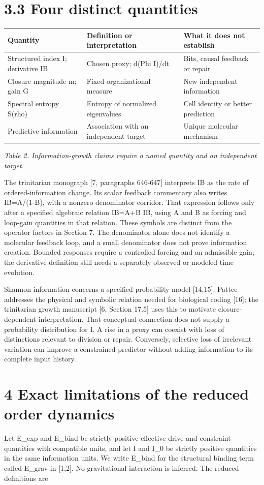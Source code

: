 \documentclass[11pt,a4paper]{article}
\begin{document}
\section*{3.3 Four distinct quantities}
\begin{longtable}{p{5.27cm}|p{5.27cm}|p{5.27cm}}
Quantity & Definition or interpretation & What it does not establish\\\hline
Structured index I; derivative IB & Chosen proxy; d(Phi I)/dt & Bits, causal feedback or repair\\\hline
Closure magnitude m; gain G & Fixed organizational measure & New independent information\\\hline
Spectral entropy S(rho) & Entropy of normalized eigenvalues & Cell identity or better prediction\\\hline
Predictive information & Association with an independent target & Unique molecular mechanism\\\hline
\end{longtable}{\small\itshape Table 2. Information-growth claims require a named quantity and an independent target.\par}
The trinitarian monograph [7, paragraphs 646-647] interprets IB as the rate of ordered-information change. Its scalar feedback commentary also writes IB=A/(1-B), with a nonzero denominator corridor. That expression follows only after a specified algebraic relation IB=A+B IB, using A and B as forcing and loop-gain quantities in that relation. These symbols are distinct from the operator factors in Section 7. The denominator alone does not identify a molecular feedback loop, and a small denominator does not prove information creation. Bounded responses require a controlled forcing and an admissible gain; the derivative definition still needs a separately observed or modeled time evolution.

Shannon information concerns a specified probability model [14,15]. Pattee addresses the physical and symbolic relation needed for biological coding [16]; the trinitarian growth manuscript [6, Section 17.5] uses this to motivate closure-dependent interpretation. That conceptual connection does not supply a probability distribution for I. A rise in a proxy can coexist with loss of distinctions relevant to division or repair. Conversely, selective loss of irrelevant variation can improve a constrained predictor without adding information to its complete input history.

\section*{4 Exact limitations of the reduced order dynamics}
Let E\_exp and E\_bind be strictly positive effective drive and constraint quantities with compatible units, and let I and I\_0 be strictly positive quantities in the same information units. We write E\_bind for the structural binding term called E\_grav in [1,2]. No gravitational interaction is inferred. The reduced definitions are
\end{document}
